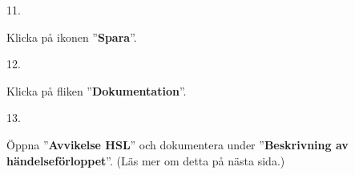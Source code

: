 \documentclass[paper=a5,DIV=15,headinclude,twoside=semi,openany,titlepage=firstiscover]{scrbook}
\begin{document}
\noindent\hrulefill

\vfill
\noindent
\begin{minipage}[t]{0.06\textwidth}
	11.
\end{minipage}%
\begin{minipage}[t]{.44\textwidth}\raggedright
	Klicka på ikonen ”\textbf{Spara}”.
\end{minipage}%
\begin{minipage}[t]{.5\textwidth}
	\hfill{}
\end{minipage}
\vfill

\noindent\hrulefill

\vfill
\noindent
\begin{minipage}[t]{0.06\textwidth}
	12.
\end{minipage}%
\begin{minipage}[t]{.44\textwidth}\raggedright
	Klicka på fliken ”\textbf{Dokumentation}”.
\end{minipage}%
\begin{minipage}[t]{.5\textwidth}
	\hfill{}
\end{minipage}
\vfill

\noindent\hrulefill

\vfill
\noindent
\begin{minipage}[t]{0.06\textwidth}
	13.
\end{minipage}%
\begin{minipage}[t]{.45\textwidth}\raggedright
	Öppna ”\textbf{Avvikelse HSL}” och dokumentera under ”\textbf{Beskrivning av händelseförloppet}”. (Läs mer om detta på nästa sida.)
\end{minipage}%
\begin{minipage}[t]{.49\textwidth}
	\hfill{}
\end{minipage}
\vfill
\end{document}
